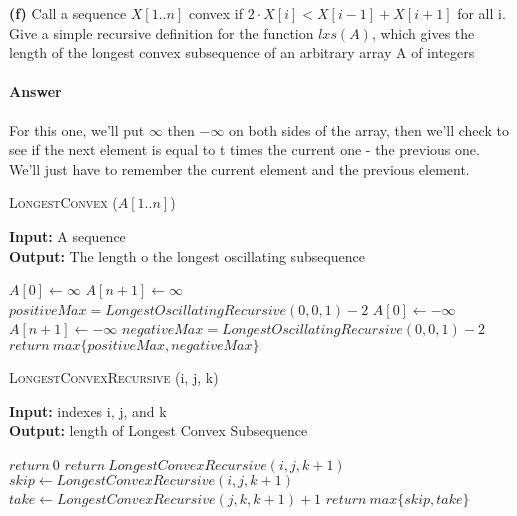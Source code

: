 \documentclass{article}
\begin{document}
{\bf (f)} Call a sequence $X[1.. n]$ convex if $2 \cdot X[i] < X[i-1] + X[i+1]$ for all i.
Give a simple recursive definition for the function $lxs(A)$, which gives
the length of the longest convex subsequence of an arbitrary array A of
integers

\paragraph{Answer}

For this one, we'll put $\infty$ then $-\infty$ on both sides of the array, then we'll check to see
if the next element is equal to t times the current one - the previous one. We'll just have to
remember the current element and the previous element.

\begin{algorithm} \caption{\textsc{LongestConvex} ($A[1..n]$)}\label{alg:seb}
    {\bf Input:} A sequence\\
    {\bf Output:} The length o the longest oscillating subsequence
    \begin{algorithmic}[1]
        \State$A[0] \gets \infty$
        \State$A[n+1] \gets \infty$
        \State$positiveMax = LongestOscillatingRecursive(0, 0, 1) -2$
        \State$A[0] \gets -\infty$
        \State$A[n+1] \gets -\infty$
        \State$negativeMax = LongestOscillatingRecursive(0, 0, 1) -2$
        \State$return\ max\{positiveMax, negativeMax\}$
    \end{algorithmic}
\end{algorithm}

\begin{algorithm} \caption{\textsc{LongestConvexRecursive} (i, j, k)}\label{alg:seb}
    {\bf Input:} indexes i, j, and k\\
    {\bf Output:} length of Longest Convex Subsequence
    \begin{algorithmic}[1]
            \State$return\ 0$
            \State$return\ LongestConvexRecursive(i, j, k +1)$
        \EndIf{}
        \Else{}
            \State$skip \gets LongestConvexRecursive(i, j, k+1)$
            \State$take \gets LongestConvexRecursive(j, k, k+1) +1$
        \State$return\ max\{skip, take\}$
        \EndIf{}
    \end{algorithmic}
\end{algorithm}
\todo{}
\end{document}
